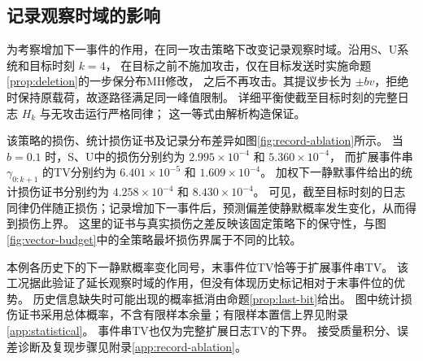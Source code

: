 \subsection{记录观察时域的影响}
\label{sec:record-ablation}
为考察增加下一事件的作用，在同一攻击策略下改变记录观察时域。沿用S、U系统和目标时刻 $k=4$，
在目标之前不施加攻击，仅在目标发送时实施命题\ref{prop:deletion}的一步保分布MH修改，
之后不再攻击。其提议步长为 $\pm bv$，拒绝时保持原载荷，故逐路径满足同一峰值限制。
详细平衡使截至目标时刻的完整日志 $H_k$ 与无攻击运行严格同律；
这一等式由解析构造保证。

该策略的损伤、统计损伤证书及记录分布差异如图\ref{fig:record-ablation}所示。
当 $b=0.1$ 时，S、U中的损伤分别约为 $2.995\times10^{-4}$ 和 $5.360\times10^{-4}$，
而扩展事件串 $\gamma_{0:k+1}$ 的TV分别约为 $6.401\times10^{-5}$ 和 $1.609\times10^{-4}$。
加权下一静默事件给出的统计损伤证书分别约为 $4.258\times10^{-4}$ 和 $8.430\times10^{-4}$。
可见，截至目标时刻的日志同律仍伴随正损伤；记录增加下一事件后，预测偏差使静默概率发生变化，从而得到损伤上界。
这里的证书与真实损伤之差反映该固定策略下的保守性，与图\ref{fig:vector-budget}中的全策略最坏损伤界属于不同的比较。

本例各历史下的下一静默概率变化同号，末事件位TV恰等于扩展事件串TV。
该工况据此验证了延长观察时域的作用，但没有体现历史标记相对于末事件位的优势。
历史信息缺失时可能出现的概率抵消由命题\ref{prop:last-bit}给出。
图中统计损伤证书采用总体概率，不含有限样本余量；有限样本置信上界见附录\ref{app:statistical}。
事件串TV也仅为完整扩展日志TV的下界。
接受质量积分、误差诊断及复现步骤见附录\ref{app:record-ablation}。



